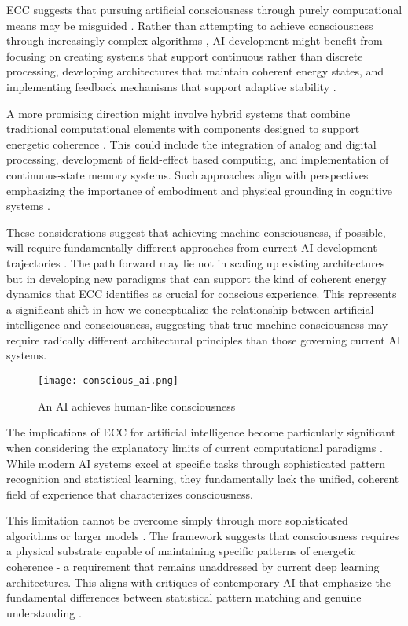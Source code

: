 \begin{refsection}
ECC suggests that pursuing artificial consciousness through purely computational means may be misguided \cite{Churchland2013}. Rather than attempting to achieve consciousness through increasingly complex algorithms \cite{butlin2023consciousnessartificialintelligenceinsights}, AI development might benefit from focusing on creating systems that support continuous rather than discrete processing, developing architectures that maintain coherent energy states, and implementing feedback mechanisms that support adaptive stability \cite{Brooks1999}.

A more promising direction might involve hybrid systems that combine traditional computational elements with components designed to support energetic coherence \cite{Hawkins2021}. This could include the integration of analog and digital processing, development of field-effect based computing, and implementation of continuous-state memory systems. Such approaches align with perspectives emphasizing the importance of embodiment and physical grounding in cognitive systems \cite{Braitenberg1986}.

These considerations suggest that achieving machine consciousness, if possible, will require fundamentally different approaches from current AI development trajectories \cite{Dennett2017}. The path forward may lie not in scaling up existing architectures but in developing new paradigms that can support the kind of coherent energy dynamics that ECC identifies as crucial for conscious experience. This represents a significant shift in how we conceptualize the relationship between artificial intelligence and consciousness, suggesting that true machine consciousness may require radically different architectural principles than those governing current AI systems.

\begin{figure}[h]
    \centering
    \texttt{[image: conscious\_ai.png]}

    \caption{An AI achieves human-like consciousness}
\end{figure}

The implications of ECC for artificial intelligence become particularly significant when considering the explanatory limits of current computational paradigms \cite{Hoffman2019}. While modern AI systems excel at specific tasks through sophisticated pattern recognition and statistical learning, they fundamentally lack the unified, coherent field of experience that characterizes consciousness.

This limitation cannot be overcome simply through more sophisticated algorithms or larger models \cite{Mitchell2019}. The framework suggests that consciousness requires a physical substrate capable of maintaining specific patterns of energetic coherence - a requirement that remains unaddressed by current deep learning architectures. This aligns with critiques of contemporary AI that emphasize the fundamental differences between statistical pattern matching and genuine understanding \cite{Marcus2019}.


\end{refsection}
